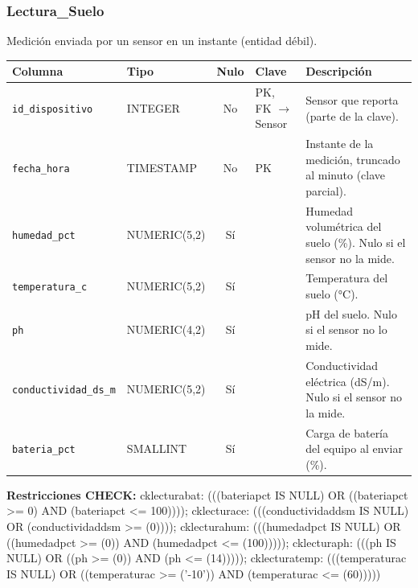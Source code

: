 \documentclass[11pt,letterpaper]{article}
\newcommand{\tbus}{\textunderscore\allowbreak}
\newcommand{\tb}[1]{{\ttfamily\let\_\tbus #1}}
\begin{document}
\subsubsection*{Lectura\_Suelo}
Medición enviada por un sensor en un instante (entidad débil).
{\footnotesize
\begin{longtable}{>{\raggedright\arraybackslash}p{3.3cm}>{\raggedright\arraybackslash}p{2.5cm}c>{\raggedright\arraybackslash}p{2.2cm}>{\raggedright\arraybackslash}p{6.1cm}}
\toprule
\textbf{Columna} & \textbf{Tipo} & \textbf{Nulo} & \textbf{Clave} & \textbf{Descripción} \\
\midrule
\endhead
\texttt{id\_dispositivo} & INTEGER & No & PK, FK $\to$ Sensor & Sensor que reporta (parte de la clave). \\
\texttt{fecha\_hora} & TIMESTAMP & No & PK & Instante de la medición, truncado al minuto (clave parcial). \\
\texttt{humedad\_pct} & NUMERIC(5,2) & Sí &  & Humedad volumétrica del suelo (\%). Nulo si el sensor no la mide. \\
\texttt{temperatura\_c} & NUMERIC(5,2) & Sí &  & Temperatura del suelo (°C). \\
\texttt{ph} & NUMERIC(4,2) & Sí &  & pH del suelo. Nulo si el sensor no lo mide. \\
\texttt{conductividad\_ds\_m} & NUMERIC(5,2) & Sí &  & Conductividad eléctrica (dS/m). Nulo si el sensor no la mide. \\
\texttt{bateria\_pct} & SMALLINT & Sí &  & Carga de batería del equipo al enviar (\%). \\
\bottomrule
\end{longtable}}
{\footnotesize\textbf{Restricciones CHECK:} \tb{ck\_lectura\_bat}: \tb{(((bateria\_pct IS NULL) OR ((bateria\_pct >= 0) AND (bateria\_pct <= 100))))}; \tb{ck\_lectura\_ce}: \tb{(((conductividad\_ds\_m IS NULL) OR (conductividad\_ds\_m >= (0))))}; \tb{ck\_lectura\_hum}: \tb{(((humedad\_pct IS NULL) OR ((humedad\_pct >= (0)) AND (humedad\_pct <= (100)))))}; \tb{ck\_lectura\_ph}: \tb{(((ph IS NULL) OR ((ph >= (0)) AND (ph <= (14)))))}; \tb{ck\_lectura\_temp}: \tb{(((temperatura\_c IS NULL) OR ((temperatura\_c >= ('-10')) AND (temperatura\_c <= (60)))))}\par}
\medskip
\end{document}
